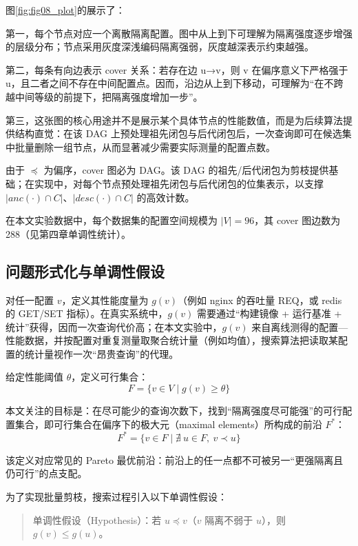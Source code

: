 \documentclass[UTF8,a4paper,12pt,twoside]{ctexart}  %
\begin{document}
图\ref{fig:fig08_plot}的展示了：

第一，每个节点对应一个离散隔离配置。图中从上到下可理解为隔离强度逐步增强的层级分布；节点采用灰度深浅编码隔离强弱，灰度越深表示约束越强。

第二，每条有向边表示 cover 关系：若存在边 u→v，则 v 在偏序意义下严格强于
u，且二者之间不存在中间配置点。因而，沿边从上到下移动，可理解为``在不跨越中间等级的前提下，把隔离强度增加一步''。

第三，这张图的核心用途并不是展示某个具体节点的性能数值，而是为后续算法提供结构直觉：在该
DAG
上预处理祖先闭包与后代闭包后，一次查询即可在候选集中批量删除一组节点，从而显著减少需要实际测量的配置点数。

由于 \(\preceq\) 为偏序，cover 图必为 DAG。该 DAG
的祖先/后代闭包为剪枝提供基础；在实现中，对每个节点预处理祖先闭包与后代闭包的位集表示，以支撑
\(|anc(\cdot)\cap C|\)、\(|desc(\cdot)\cap C|\) 的高效计数。

在本文实验数据中，每个数据集的配置空间规模为 \(|V|=96\)，其 cover
图边数为 288（见第四章单调性统计）。

\subsection{问题形式化与单调性假设}

对任一配置 \(v\)，定义其性能度量为 \(g(v)\)（例如 nginx 的吞吐量 REQ，或
redis 的 GET/SET 指标）。在真实系统中，\(g(v)\) 需要通过``构建镜像 +
运行基准 + 统计''获得，因而一次查询代价高；在本文实验中，\(g(v)\)
来自离线测得的配置---性能数据，并按配置对重复测量取聚合统计量（例如均值），搜索算法把读取某配置的统计量视作一次``昂贵查询''的代理。

给定性能阈值 \(\theta\)，定义可行集合：
\begin{equation}
F = \{ v \in V \mid g(v) \ge \theta \}
\end{equation}

本文关注的目标是：在尽可能少的查询次数下，找到``隔离强度尽可能强''的可行配置集合，即可行集合在偏序下的极大元（maximal
elements）所构成的前沿 \(F^*\)：
\begin{equation}
F^* = \{v\in F\mid \nexists\ u\in F,\ v\prec u\}
\end{equation}

该定义对应常见的 Pareto
最优前沿：前沿上的任一点都不可被另一``更强隔离且仍可行''的点支配。

为了实现批量剪枝，搜索过程引入以下单调性假设：
\begin{quote}
单调性假设（Hypothesis）：若 \(u \preceq v\)（\(v\) 隔离不弱于
\(u\)），则 \(g(v) \le g(u)\)。
\end{quote}
\end{document}
